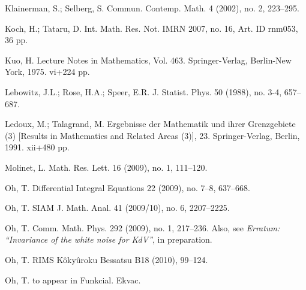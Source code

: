 \documentclass[11pt]{amsart}
\numberwithin{equation}{section} \numberwithin{theorem}{section}
\begin{document}
\begin{thebibliography}{99}
	Klainerman, S.;  Selberg, S.
	\newblock  Commun. Contemp. Math.  4  (2002),  no. 2, 223--295. 

	Koch, H.; Tataru, D.
	\newblock Int. Math. Res. Not. IMRN 2007, no. 16, Art. ID rnm053, 36 pp. 

  

	Kuo, H. 
	\newblock Lecture Notes in Mathematics, Vol. 463. Springer-Verlag, Berlin-New York, 1975. vi+224 pp.

	Lebowitz, J.L.; Rose, H.A.; Speer, E.R.
	\newblock J. Statist. Phys.  50  (1988),  no. 3-4, 657--687. 

 Ledoux, M.; Talagrand, M.
\newblock Ergebnisse der Mathematik und ihrer Grenzgebiete (3) [Results in
Mathematics and Related Areas (3)], 23. Springer-Verlag, Berlin,
1991. xii+480 pp.

	Molinet, L.
	 \newblock Math. Res. Lett.  16  (2009),  no. 1, 111--120. 

	
	
	Oh, T.
	\newblock  Differential Integral Equations  22  (2009),  no. 7--8, 637--668.

	Oh, T.
	\newblock SIAM J. Math. Anal.  41  (2009/10),  no. 6, 2207--2225.

	Oh, T.
	\newblock Comm. Math. Phys.  292  (2009),  no. 1, 217--236.
  Also, see {\it Erratum: ``Invariance of the white noise for KdV''}, in preparation.

	Oh, T.
	\newblock 	RIMS K\^oky\^uroku Bessatsu B18 (2010), 99--124.

Oh, T. 
\newblock 	to appear in Funkcial. Ekvac. 
	


\end{thebibliography}
\end{document}
